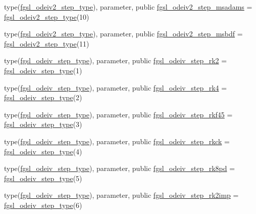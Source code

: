 \begin{DoxyCompactItemize}
\item 
type(\hyperlink{structfgsl_1_1fgsl__odeiv2__step__type}{fgsl\+\_\+odeiv2\+\_\+step\+\_\+type}), parameter, public \hyperlink{namespacefgsl_a2cdba04e438cd75d8a78612215dcc5bc}{fgsl\+\_\+odeiv2\+\_\+step\+\_\+msadams} = \hyperlink{structfgsl_1_1fgsl__odeiv2__step__type}{fgsl\+\_\+odeiv2\+\_\+step\+\_\+type}(10)
\item 
type(\hyperlink{structfgsl_1_1fgsl__odeiv2__step__type}{fgsl\+\_\+odeiv2\+\_\+step\+\_\+type}), parameter, public \hyperlink{namespacefgsl_a125bb5f7c78cd4dda6b7a957e8867653}{fgsl\+\_\+odeiv2\+\_\+step\+\_\+msbdf} = \hyperlink{structfgsl_1_1fgsl__odeiv2__step__type}{fgsl\+\_\+odeiv2\+\_\+step\+\_\+type}(11)
\item 
type(\hyperlink{structfgsl_1_1fgsl__odeiv__step__type}{fgsl\+\_\+odeiv\+\_\+step\+\_\+type}), parameter, public \hyperlink{namespacefgsl_aa58b6af1260738ff3a83d7910e978b32}{fgsl\+\_\+odeiv\+\_\+step\+\_\+rk2} = \hyperlink{structfgsl_1_1fgsl__odeiv__step__type}{fgsl\+\_\+odeiv\+\_\+step\+\_\+type}(1)
\item 
type(\hyperlink{structfgsl_1_1fgsl__odeiv__step__type}{fgsl\+\_\+odeiv\+\_\+step\+\_\+type}), parameter, public \hyperlink{namespacefgsl_a466a47d91e65ed8da5395e1e1cb53a2c}{fgsl\+\_\+odeiv\+\_\+step\+\_\+rk4} = \hyperlink{structfgsl_1_1fgsl__odeiv__step__type}{fgsl\+\_\+odeiv\+\_\+step\+\_\+type}(2)
\item 
type(\hyperlink{structfgsl_1_1fgsl__odeiv__step__type}{fgsl\+\_\+odeiv\+\_\+step\+\_\+type}), parameter, public \hyperlink{namespacefgsl_ad73c3dd0c5faf790ac4fe7c6bdfe0b75}{fgsl\+\_\+odeiv\+\_\+step\+\_\+rkf45} = \hyperlink{structfgsl_1_1fgsl__odeiv__step__type}{fgsl\+\_\+odeiv\+\_\+step\+\_\+type}(3)
\item 
type(\hyperlink{structfgsl_1_1fgsl__odeiv__step__type}{fgsl\+\_\+odeiv\+\_\+step\+\_\+type}), parameter, public \hyperlink{namespacefgsl_a0c2cde787f3c705f883a74b1be126952}{fgsl\+\_\+odeiv\+\_\+step\+\_\+rkck} = \hyperlink{structfgsl_1_1fgsl__odeiv__step__type}{fgsl\+\_\+odeiv\+\_\+step\+\_\+type}(4)
\item 
type(\hyperlink{structfgsl_1_1fgsl__odeiv__step__type}{fgsl\+\_\+odeiv\+\_\+step\+\_\+type}), parameter, public \hyperlink{namespacefgsl_a104f6eb85d1676e32d4aa0a93531ef61}{fgsl\+\_\+odeiv\+\_\+step\+\_\+rk8pd} = \hyperlink{structfgsl_1_1fgsl__odeiv__step__type}{fgsl\+\_\+odeiv\+\_\+step\+\_\+type}(5)
\item 
type(\hyperlink{structfgsl_1_1fgsl__odeiv__step__type}{fgsl\+\_\+odeiv\+\_\+step\+\_\+type}), parameter, public \hyperlink{namespacefgsl_a0352c460177df9a983fc5984dd5be04a}{fgsl\+\_\+odeiv\+\_\+step\+\_\+rk2imp} = \hyperlink{structfgsl_1_1fgsl__odeiv__step__type}{fgsl\+\_\+odeiv\+\_\+step\+\_\+type}(6)

\end{DoxyCompactItemize}
